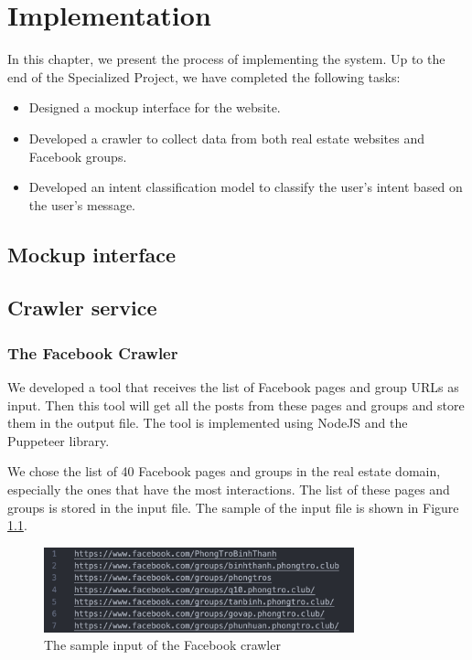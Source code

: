 \chapter{Implementation}
In this chapter, we present the process of implementing the system. Up to the end of the Specialized Project, we have completed the following tasks:
\begin{itemize}
    \item Designed a mockup interface for the website.
    \item Developed a crawler to collect data from both real estate websites and Facebook groups.
    \item Developed an intent classification model to classify the user's intent based on the user's message.
\end{itemize}

\section{Mockup interface}
\section{Crawler service}

\subsection{The Facebook Crawler}
We developed a tool that receives the list of Facebook pages and group URLs as input. Then this tool will get all the posts from these pages and groups and store them in the output file. The tool is implemented using NodeJS and the Puppeteer library.

We chose the list of 40 Facebook pages and groups in the real estate domain, especially the ones that have the most interactions. The list of these pages and groups is stored in the input file. The sample of the input file is shown in Figure \ref{fig:facebook-crawler-input}.

\begin{figure}[ht]
    \centering
    \includegraphics[width=0.8\textwidth]{Images/9.Implementation/facebook_crawler_input.png}
    \caption{The sample input of the Facebook crawler}
    \label{fig:facebook-crawler-input}
\end{figure}

